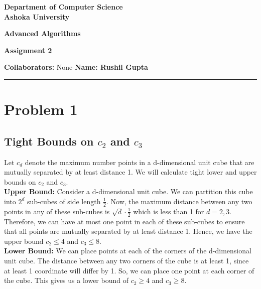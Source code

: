 \documentclass[a4paper]{article}
\begin{document}
\begin{center}
{\large \bf \color{red}  Department of Computer Science} \\
{\large \bf \color{red}  Ashoka University} \\

\vspace{0.1in}

{\large \bf \color{blue} Advanced Algorithms}

\vspace{0.05in}

    { \bf \color{YellowOrange} Assignment 2}
\end{center}
\medskip

{\textbf{Collaborators:} None} \hfill {\textbf{Name: Rushil Gupta} }

\bigskip
\hrule


\section*{Problem 1}

\subsection*{Tight Bounds on $c_2$ and $c_3$}
Let $c_d$ denote the maximum number points in a d-dimensional unit cube that are mutually separated by at least distance 1. We will calculate tight lower and upper bounds on $c_2$ and $c_3$.\\

\noindent
\textbf{Upper Bound:} Consider a d-dimensional unit cube. We can partition this cube into $2^d$ sub-cubes of side length $\frac{1}{2}$. Now, the maximum distance between any two points in any of these sub-cubes is $\sqrt{d} \cdot \frac{1}{2}$ which is less than 1 for $d = 2, 3$. Therefore, we can have at most one point in each of these sub-cubes to ensure that all points are mutually separated by at least distance 1. Hence, we have the upper bound $c_2 \leq 4$ and $c_3 \leq 8$.\\

\noindent
\textbf{Lower Bound:} We can place points at each of the corners of the d-dimensional unit cube. The distance between any two corners of the cube is at least 1, since at least 1 coordinate will differ by 1. So, we can place one point at each corner of the cube. This gives us a lower bound of $c_2 \geq 4$ and $c_3 \geq 8$.\\
\end{document}
